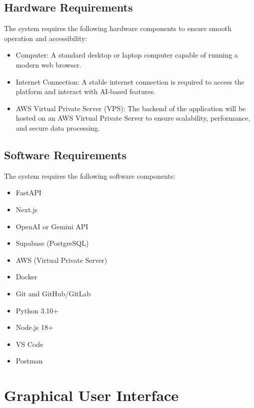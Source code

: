 \documentclass{FastFyp}
\begin{document}
\subsection{Hardware Requirements}

The system requires the following hardware components to ensure smooth operation and accessibility:

\begin{itemize}
    \item Computer: A standard desktop or laptop computer capable of running a modern web browser.
    
    \item Internet Connection: A stable internet connection is required to access the platform and interact with AI-based features.
    
    \item AWS Virtual Private Server (VPS): The backend of the application will be hosted on an AWS Virtual Private Server to ensure scalability, performance, and secure data processing.
\end{itemize}

\subsection{Software Requirements}

The system requires the following software components:

\begin{itemize}
    \item FastAPI
    \item Next.js
    \item OpenAI or Gemini API
    \item Supabase (PostgreSQL)
    \item AWS (Virtual Private Server)
    \item Docker
    \item Git and GitHub/GitLab
    \item Python 3.10+
    \item Node.js 18+
    \item VS Code
    \item Postman
\end{itemize}



\section{Graphical User Interface}
\end{document}
